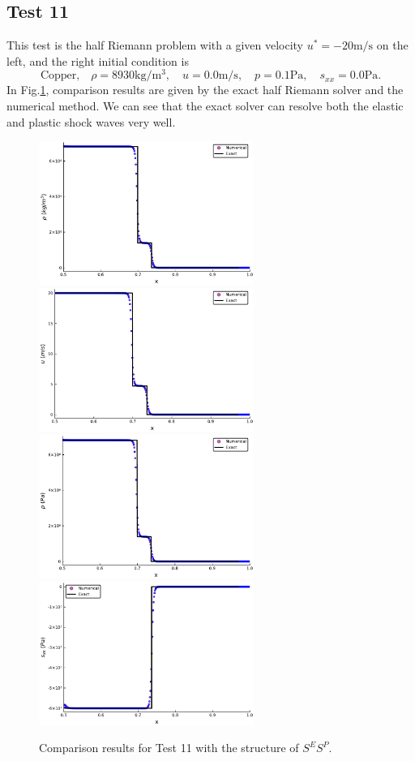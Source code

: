 \documentclass{article}
\numberwithin{equation}{section}
\numberwithin{table}{section}
\begin{document}
\subsection{Test 11}
This test is the half Riemann problem with a given velocity $u^* = -20\text{m/s}$ on the left, and the right initial condition is
\begin{equation}
 \text{Copper,}\quad\rho = 8930\text{kg}/\text{m}^3, \quad  u = 0.0\text{m}/\text{s}, \quad  p =0.1\text{Pa}, \quad  s_{xx}=0.0\text{Pa}.
\end{equation}
In Fig.\ref{fig:case9}, comparison results are given by the exact half Riemann solver and the numerical method. We can see that the exact solver can resolve both the elastic and plastic shock waves very well.
\begin{figure}[ht]
  \centering
  \includegraphics[width= 7cm] {case10rho.pdf}
  \includegraphics[width= 7cm] {case10u.pdf}
  \includegraphics[width= 7cm] {case10p.pdf}
  \includegraphics[width= 7cm] {case10sxx.pdf}

    \caption{Comparison results for Test 11 with the structure of $S^ES^P$.  }
  \label{fig:case9}
\end{figure}
\end{document}
